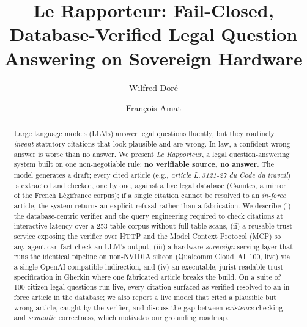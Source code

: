 \documentclass[sigconf, nonacm]{acmart}
\begin{document}
\title{Le Rapporteur: Fail-Closed, Database-Verified Legal
Question Answering on Sovereign Hardware}

\author{Wilfred Dor\'e}

\author{Fran\c{c}ois Amat}

\renewcommand{\shortauthors}{Dor\'e and Amat}

\begin{abstract}
Large language models (LLMs) answer legal questions fluently, but they
routinely \emph{invent} statutory citations that look plausible and are
wrong. In law, a confident wrong answer is worse than no answer. We present
\emph{Le Rapporteur}, a legal question-answering system built on one
non-negotiable rule: \textbf{no verifiable source, no answer}. The model
generates a draft; every cited article (e.g., \emph{article L.\,3121-27 du
Code du travail}) is extracted and checked, one by one, against a live legal
database (Canutes, a mirror of the French Légifrance corpus); if a single
citation cannot be resolved to an \emph{in-force} article, the system returns
an explicit refusal rather than a fabrication. We describe (i) the
database-centric verifier and the query engineering required to check
citations at interactive latency over a 253-table corpus without
full-table scans, (ii) a reusable trust service exposing the verifier over
HTTP and the Model Context Protocol (MCP) so any agent can fact-check an
LLM's output, (iii) a hardware-\emph{sovereign} serving layer that runs the
identical pipeline on non-NVIDIA silicon (Qualcomm Cloud~AI~100, live) via a
single OpenAI-compatible indirection, and (iv) an executable, jurist-readable
trust specification in Gherkin where one fabricated article breaks the build.
On a suite of 100 citizen legal questions run live, every citation surfaced as
verified resolved to an in-force article in the database; we also report a live
model that cited a plausible but wrong article, caught by the verifier, and
discuss the gap between \emph{existence} checking and \emph{semantic}
correctness, which motivates our grounding roadmap.
\end{abstract}

\end{document}

